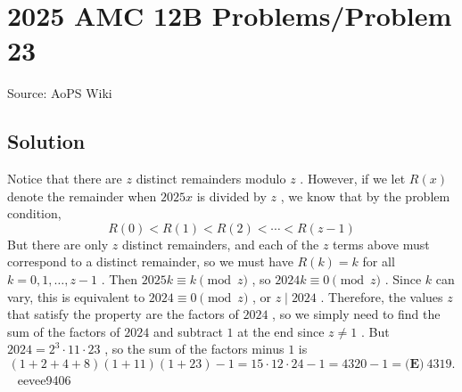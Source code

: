 \documentclass[12pt]{article}
\begin{document}
\section*{{2025 AMC 12B Problems/Problem 23}}
Source: AoPS Wiki

\subsection*{Solution}
Notice that there are $z$ distinct remainders modulo $z$ . However, if we let $R(x)$ denote the remainder when $2025x$ is divided by $z$ , we know that by the problem condition, \[R(0)<R(1)<R(2)<\cdots<R(z-1)\] But there are only $z$ distinct remainders, and each of the $z$ terms above must correspond to a distinct remainder, so we must have $R(k)=k$ for all $k=0,1,\dots,z-1$ . Then $2025k\equiv k\pmod{z}$ , so $2024k\equiv 0\pmod{z}$ . Since $k$ can vary, this is equivalent to $2024\equiv 0\pmod{z}$ , or $z\mid 2024$ . Therefore, the values $z$ that satisfy the property are the factors of $2024$ , so we simply need to find the sum of the factors of $2024$ and subtract $1$ at the end since $z\ne 1$ . But $2024=2^3\cdot 11\cdot 23$ , so the sum of the factors minus $1$ is \[(1+2+4+8)(1+11)(1+23)-1=15\cdot12\cdot24-1=4320-1=\boxed{\textbf{(E)}~4319 }.\] ~ eevee9406
\end{document}
